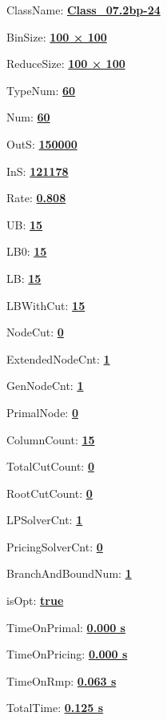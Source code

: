 \documentclass[11pt]{article}
\begin{document}
\pagestyle{empty}


ClassName: \underline{\textbf{Class_07.2bp-24}}
\par
BinSize: \underline{\textbf{100 × 100}}
\par
ReduceSize: \underline{\textbf{100 × 100}}
\par
TypeNum: \underline{\textbf{60}}
\par
Num: \underline{\textbf{60}}
\par
OutS: \underline{\textbf{150000}}
\par
InS: \underline{\textbf{121178}}
\par
Rate: \underline{\textbf{0.808}}
\par
UB: \underline{\textbf{15}}
\par
LB0: \underline{\textbf{15}}
\par
LB: \underline{\textbf{15}}
\par
LBWithCut: \underline{\textbf{15}}
\par
NodeCut: \underline{\textbf{0}}
\par
ExtendedNodeCnt: \underline{\textbf{1}}
\par
GenNodeCnt: \underline{\textbf{1}}
\par
PrimalNode: \underline{\textbf{0}}
\par
ColumnCount: \underline{\textbf{15}}
\par
TotalCutCount: \underline{\textbf{0}}
\par
RootCutCount: \underline{\textbf{0}}
\par
LPSolverCnt: \underline{\textbf{1}}
\par
PricingSolverCnt: \underline{\textbf{0}}
\par
BranchAndBoundNum: \underline{\textbf{1}}
\par
isOpt: \underline{\textbf{true}}
\par
TimeOnPrimal: \underline{\textbf{0.000 s}}
\par
TimeOnPricing: \underline{\textbf{0.000 s}}
\par
TimeOnRmp: \underline{\textbf{0.063 s}}
\par
TotalTime: \underline{\textbf{0.125 s}}
\par
\newpage


\end{document}
